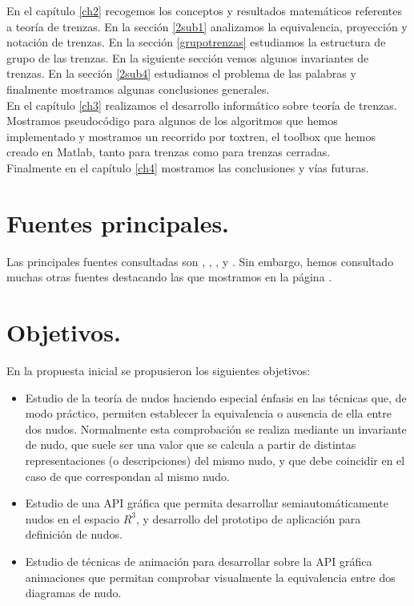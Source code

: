 En el capítulo \ref{ch2} recogemos los conceptos y resultados matemáticos referentes a teoría de trenzas. En la sección \ref{2sub1} analizamos la equivalencia, proyección y notación de trenzas. En la sección \ref{grupotrenzas} estudiamos la estructura de grupo de las trenzas. En la siguiente sección vemos algunos invariantes de trenzas. En la sección \ref{2sub4} estudiamos el problema de las palabras y finalmente mostramos algunas conclusiones generales. \\

En el capítulo \ref{ch3} realizamos el desarrollo informático sobre teoría de trenzas. Mostramos pseudocódigo para algunos de los algoritmos que hemos implementado y mostramos un recorrido por toxtren, el toolbox que hemos creado en Matlab, tanto para trenzas como para trenzas cerradas. \\

Finalmente en el capítulo \ref{ch4} mostramos las conclusiones y vías futuras. 

\section{Fuentes principales.}
Las principales fuentes consultadas son \cite{1}, \cite{2}, \cite{3}, \cite{4} y \cite{5}. Sin embargo, hemos consultado muchas otras fuentes destacando las que mostramos en la página \pageref{bibliog}.

\section{Objetivos.}

En la propuesta inicial se propusieron los siguientes objetivos:
\begin{itemize}
	\item Estudio de la teoría de nudos haciendo especial énfasis en las técnicas que, de modo práctico, permiten establecer la equivalencia o ausencia de ella entre dos nudos. Normalmente esta comprobación se realiza mediante un invariante de nudo, que suele ser una valor que se calcula a partir de distintas representaciones (o descripciones) del mismo nudo, y que debe coincidir en el caso de que correspondan al mismo nudo.
	
	\item Estudio de una API gráfica que permita desarrollar semiautomáticamente nudos en el espacio $ R^{3} $, y desarrollo del prototipo de aplicación para definición de nudos.
	
	\item Estudio de técnicas de animación para desarrollar sobre la API gráfica animaciones que permitan comprobar visualmente la equivalencia entre dos diagramas de nudo.
\end{itemize}

